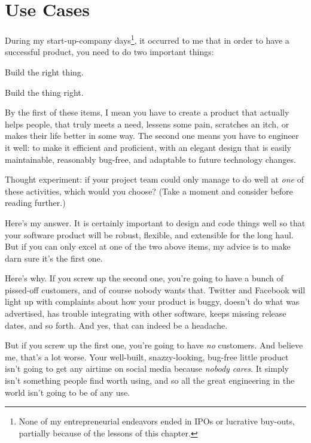 
\chapter{Use Cases}

During my start-up-company days\footnote{None of my entrepreneurial endeavors
ended in IPOs or lucrative buy-outs, partially because of the lessons of this
chapter.}, it occurred to me that in order to have a successful product, you
need to do two important things:

\begin{compactenum}
\item Build the right thing.
\item Build the thing right.
\end{compactenum}

By the first of these items, I mean you have to create a product that actually
helps people, that truly meets a need, lessens some pain, scratches an itch,
or makes their life better in some way. The second one means you have to
engineer it well: to make it efficient and proficient, with an elegant design
that is easily maintainable, reasonably bug-free, and adaptable to future
technology changes.

Thought experiment: if your project team could only manage to do well at
\textit{one} of these activities, which would you choose? (Take a moment and
consider before reading further.)

Here's my answer. It is certainly important to design and code things well so
that your software product will be robust, flexible, and extensible for the
long haul. But if you can only excel at one of the two above items, my advice
is to make darn sure it's the first one.

Here's why. If you screw up the second one, you're going to have a bunch of
pissed-off customers, and of course nobody wants that. Twitter and Facebook
will light up with complaints about how your product is buggy, doesn't do what
was advertised, has trouble integrating with other software, keeps missing
release dates, and so forth. And yes, that can indeed be a headache.

But if you screw up the first one, you're going to have \textit{no} customers.
And believe me, that's a lot worse. Your well-built, snazzy-looking, bug-free
little product isn't going to get any airtime on social media because
\textit{nobody cares}. It simply isn't something people find worth using, and
so all the great engineering in the world isn't going to be of any use.

